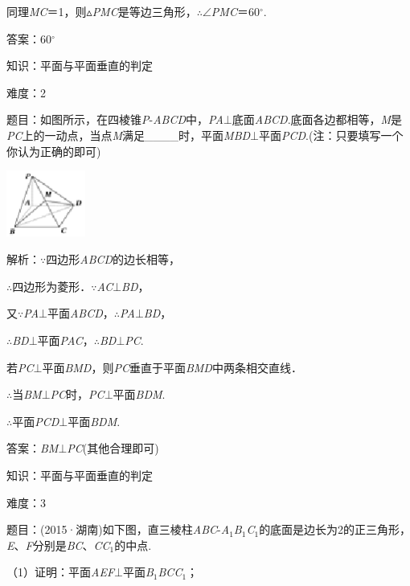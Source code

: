 \documentclass{article} %
\begin{document}
同理\textit{MC}＝1，则$\mathrm{\vartriangle}$\textit{PMC}是等边三角形，$\mathrm{\therefore}$$\mathrm{\angle}$\textit{PMC}＝60$\mathrm{{}^\circ}$.

答案：60$\mathrm{{}^\circ}$

知识：平面与平面垂直的判定

难度：2

题目：如图所示，在四棱锥\textit{P}-\textit{ABCD}中，\textit{PA}$\mathrm{\bot}$底面\textit{ABCD}.底面各边都相等，\textit{M}是\textit{PC}上的一动点，当点\textit{M}满足\_\_\_\_时，平面\textit{MBD}$\mathrm{\bot}$平面\textit{PCD}.(注：只要填写一个你认为正确的即可)

\includegraphics*[width=1.02in, height=0.86in, keepaspectratio=false]{image225}

解析：$\mathrm{\because}$四边形\textit{ABCD}的边长相等，

$\mathrm{\therefore}$四边形为菱形．$\mathrm{\because}$\textit{AC}$\mathrm{\bot}$\textit{BD}，

又$\mathrm{\because}$\textit{PA}$\mathrm{\bot}$平面\textit{ABCD}，$\mathrm{\therefore}$\textit{PA}$\mathrm{\bot}$\textit{BD}，

$\mathrm{\therefore}$\textit{BD}$\mathrm{\bot}$平面\textit{PAC}，$\mathrm{\therefore}$\textit{BD}$\mathrm{\bot}$\textit{PC}.

若\textit{PC}$\mathrm{\bot}$平面\textit{BMD}，则\textit{PC}垂直于平面\textit{BMD}中两条相交直线．

$\mathrm{\therefore}$当\textit{BM}$\mathrm{\bot}$\textit{PC}时，\textit{PC}$\mathrm{\bot}$平面\textit{BDM}.

$\mathrm{\therefore}$平面\textit{PCD}$\mathrm{\bot}$平面\textit{BDM}.

答案：\textit{BM}$\mathrm{\bot}$\textit{PC}(其他合理即可)

知识：平面与平面垂直的判定

难度：3

题目：(2015·湖南)如下图，直三棱柱\textit{ABC}-\textit{A}${}_{1}$\textit{B}${}_{1}$\textit{C}${}_{1}$的底面是边长为2的正三角形，\textit{E}、\textit{F}分别是\textit{BC}、\textit{CC}${}_{1}$的中点.

（1）证明：平面\textit{AEF}$\mathrm{\bot}$平面\textit{B}${}_{1}$\textit{BCC}${}_{1}$；
\end{document}

